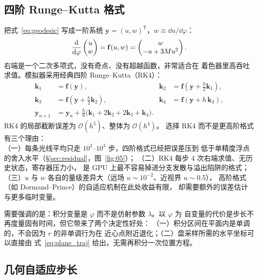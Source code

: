 \subsection{四阶 Runge--Kutta 格式}\label{sec:rk4}

把式~\eqref{eq:geodesic} 写成一阶系统
$\mathbf y=(u,w)^{\mathsf T}$，$w\equiv\dd u/\dd\varphi$：
\begin{equation}
\frac{\mathrm{d}}{\mathrm{d}\varphi}
\begin{pmatrix}u\\ w\end{pmatrix}
=\mathbf f(u,w)=\begin{pmatrix}w\\ -u+3M u^{2}\end{pmatrix}.
\label{eq:system}
\end{equation}
右端是一个二次多项式，没有奇点、没有超越函数，非常适合在
着色器里高吞吐求值。模拟器采用经典四阶 Runge--Kutta（RK4）：
\begin{equation}
\begin{aligned}
\mathbf k_1&=\mathbf f(\mathbf y), &
\mathbf k_2&=\mathbf f(\mathbf y+\tfrac h2\mathbf k_1),\\
\mathbf k_3&=\mathbf f(\mathbf y+\tfrac h2\mathbf k_2), &
\mathbf k_4&=\mathbf f(\mathbf y+h\,\mathbf k_3),\\
\mathbf y_{n+1}&=\mathbf y_n+\frac h6\bigl(\mathbf k_1+2\mathbf k_2+2\mathbf k_3+\mathbf k_4\bigr).
\end{aligned}
\label{eq:rk4}
\end{equation}
RK4 的局部截断误差为 $\mathcal O(h^5)$、整体为 $\mathcal O(h^4)$。
选择 RK4 而不是更高阶格式有三个理由：\\
（一）每条光线平均只走 $10^2$--$10^3$ 步，四阶格式已经把误差压到
低于单精度浮点的舍入水平（\S\ref{sec:residual}，图~\ref{fig:05}）；
（二）RK4 每步 4 次右端求值、无历史状态，寄存器压力小，
是 GPU 上最不容易掉进分支发散与溢出陷阱的格式；
（三）$u$ 与 $w$ 各自的量级差异大（远场 $u\sim10^{-2}$、近视界 $u\sim0.5$），
高阶格式（如 Dormand--Prince）的自适应机制在此处收益有限，
却需要额外的误差估计与更多临时变量。

需要强调的是：积分变量是 $\varphi$ 而不是仿射参数 $\lambda$。以 $\varphi$ 为
自变量的代价是步长不再度量固有时间，但它带来了两个决定性好处：
（一）积分区间在平面内是单调的，不会因为 $r$ 的非单调行为在
近心点附近退化；（二）盘采样所需的水平坐标可以直接由
式~\eqref{eq:plane_traj} 给出，无需再积分一次位置方程。

\subsection{几何自适应步长}\label{sec:stepsize}

